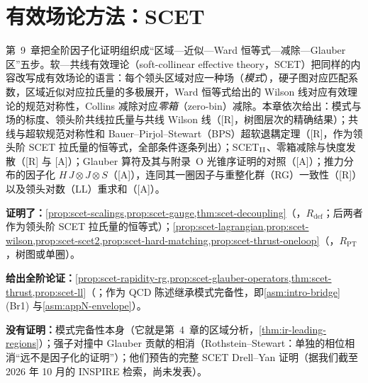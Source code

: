 \chapter{有效场论方法：SCET}\label{ch:scet}

第~9~章把全阶因子化证明组织成“区域—近似—Ward 恒等式—减除—Glauber 区”五步。软—共线有效理论（soft-collinear effective theory，SCET）\cite{BauerFlemingLuke2000,BauerEtAl2001,BauerStewart2001,BauerPirjolStewart2002,BauerEtAl2002}把同样的内容改写成有效场论的语言：每个领头区域对应一种场（\emph{模式}），硬子图对应匹配系数，区域近似对应拉氏量的多极展开，Ward 恒等式给出的 Wilson 线对应有效理论的规范对称性，Collins 减除对应\emph{零箱}（zero-bin）减除。本章依次给出：模式与场的标度、领头阶共线拉氏量与共线 Wilson 线（[R]，树图层次的精确结果）；共线与超软规范对称性和 Bauer--Pirjol--Stewart（BPS）超软退耦定理（[R]，作为领头阶 SCET 拉氏量的恒等式，全部条件逐条列出）；SCET$_{\rm II}$、零箱减除与快度发散（[R] 与 [A]）；Glauber 算符及其与附录~O 光锥序证明的对照（[A]）；推力分布的因子化 $H\,J\otimes J\otimes S$（[A]），连同其一圈因子与重整化群（RG）一致性（[R]）以及领头对数（LL）重求和（[A]）。

\begin{tcolorbox}[enhanced,breakable,title=本章证明了什么／没有证明什么,fonttitle=\bfseries,
  colback=gray!3!white,colframe=gray!55!black,boxrule=0.6pt,arc=2pt,
  left=5pt,right=5pt,top=3pt,bottom=3pt,before skip=6pt,after skip=6pt]
\textbf{证明了：}\cref{prop:scet-scalings,prop:scet-gauge,thm:scet-decoupling}（\tagR，$R_{\mathrm{def}}$；后两者作为领头阶 SCET 拉氏量的恒等式）；\cref{prop:scet-lagrangian,prop:scet-wilson,prop:scet-scet2,prop:scet-hard-matching,prop:scet-thrust-oneloop}（\tagR，$R_{\mathrm{PT}}$，树图或单圈）。\par
\textbf{给出全阶论证：}\cref{prop:scet-rapidity-rg,prop:scet-glauber-operators,thm:scet-thrust,prop:scet-ll}（\tagA；作为 QCD 陈述继承模式完备性，即\cref{asm:intro-bridge}(Br1) 与\cref{asm:appN-envelope}）。\par
\textbf{没有证明：}模式完备性本身（它就是第~4~章的区域分析，\cref{thm:ir-leading-regions}）；强子对撞中 Glauber 贡献的相消（Rothstein--Stewart：单独的相位相消“远不是因子化的证明”）；他们预告的完整 SCET Drell--Yan 证明（据我们截至 2026 年 10 月的 INSPIRE 检索，尚未发表）。
\end{tcolorbox}

